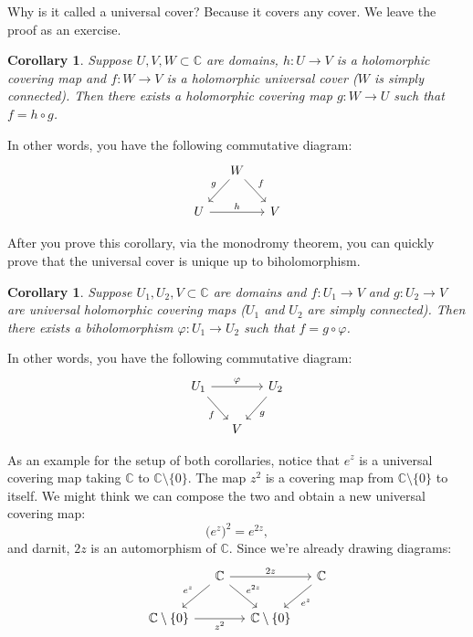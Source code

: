 \documentclass[12pt,openany]{book}
\newcommand{\C}{{\mathbb{C}}}
\theoremstyle{plain}
\newtheorem{cor}[thm]{Corollary}
\theoremstyle{remark}
\theoremstyle{definition}
\theoremstyle{exercise}
\theoremstyle{example}
\begin{document}
Why is it called a universal cover?  Because it covers any cover.
We leave the proof as an exercise.

\begin{cor} \label{cor:coverscover}
Suppose $U,V,W \subset \C$ are domains, $h \colon U \to V$ is a 
holomorphic covering map and $f \colon W \to V$ is a holomorphic universal cover ($W$ is
simply connected).  Then there exists a holomorphic covering map
$g \colon W \to U$ such that $f = h \circ g$.
\end{cor}

In other words, you have the following commutative diagram:
\begin{equation*}
\begin{tikzcd}[column sep=small]
& W \arrow[dl,"g"'] \arrow[dr,"f"] \\
U \arrow[rr,"h"]                   & & V
\end{tikzcd}
\end{equation*}

After you prove this corollary, via the monodromy theorem, you can quickly
prove
that the universal cover is unique up to biholomorphism.

\begin{cor} \label{cor:univcoveruniqe}
Suppose $U_1,U_2,V \subset \C$ are domains and $f \colon U_1 \to V$ and $g \colon
U_2 \to V$ are
universal holomorphic covering maps ($U_1$ and $U_2$ are simply connected).
Then there
exists a biholomorphism $\varphi \colon U_1 \to U_2$
such that $f = g \circ \varphi$.
\end{cor}

In other words, you have the following commutative diagram:
\begin{equation*}
\begin{tikzcd}[column sep=small]
U_1 \arrow[rr,"\varphi"] \arrow[dr,"f"'] & & U_2 \arrow[dl,"g"] \\
                               & V
\end{tikzcd}
\end{equation*}

As an example for the setup of both corollaries,
notice that $e^z$ is a universal covering map taking $\C$ to $\C \setminus \{ 0 \}$.
The map $z^2$ is a covering map from $\C \setminus \{ 0 \}$ to itself.
We might think we can compose the two and obtain a new universal covering map:
\begin{equation*}
{\bigl(e^z\bigr)}^2 = e^{2z} ,
\end{equation*}
and darnit, $2z$ is an automorphism of $\C$.  Since we're already drawing
diagrams:
\begin{equation*}
\begin{tikzcd}[column sep=small]
& \C \arrow[dl,"e^z"'] \arrow[dr,"e^{2z}"] \arrow[rr,"2z"] & & \C \arrow[dl,"e^z"] \\
\C \setminus \{ 0 \} \arrow[rr,"z^2"'] & & \C \setminus \{ 0 \} 
\end{tikzcd}
\end{equation*}
\end{document}
